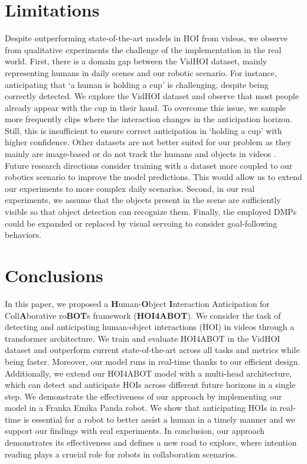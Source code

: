 \documentclass{article}
\begin{document}
\section{Limitations} Despite outperforming state-of-the-art models in HOI from videos, we observe from qualitative experiments the challenge of the implementation in the real world. First, there is a domain gap between the VidHOI dataset, mainly representing humans in daily scenes and our robotic scenario. For instance, anticipating that `a human is holding a cup' is challenging, despite being correctly detected. We explore the VidHOI dataset and observe that most people already appear with the cup in their hand. To overcome this issue, we sample more frequently clips where the interaction changes in the anticipation horizon. Still, this is insufficient to ensure correct anticipation in `holding a cup' with higher confidence. Other datasets are not better suited for our problem as they mainly are image-based \citep{Xu2018, gupta2015visual} or do not track the humans and objects in videos \citep{ji2020action}. Future research directions consider training with a dataset more coupled to our robotics scenario to improve the model predictions. This would allow us to extend our experiments to more complex daily scenarios. Second, in our real experiments, we assume that the objects present in the scene are sufficiently visible so that object detection can recognize them. Finally, the employed DMPs could be expanded or replaced by visual servoing to consider goal-following behaviors.

\section{Conclusions} In this paper, we proposed a \textbf{H}uman-\textbf{O}bject \textbf{I}nteraction Anticipation for Coll\textbf{A}borative ro\textbf{BOT}s framework (\textbf{HOI4ABOT}). We consider the task of detecting and anticipating human-object interactions (HOI) in videos through a transformer architecture. We train and evaluate HOI4ABOT in the VidHOI dataset and outperform current state-of-the-art across all tasks and metrics while being  faster. Moreover, our model runs in real-time thanks to our efficient design. Additionally, we extend our HOI4ABOT model with a multi-head architecture, which can detect and anticipate HOIs across different future horizons in a single step. We demonstrate the effectiveness of our approach by implementing our model in a Franka Emika Panda robot. We show that anticipating HOIs in real-time is essential for a robot to better assist a human in a timely manner and we support our findings with real experiments. In conclusion, our approach demonstrates its effectiveness and defines a new road to explore, where intention reading plays a crucial role for robots in collaboration scenarios. 
\end{document}
